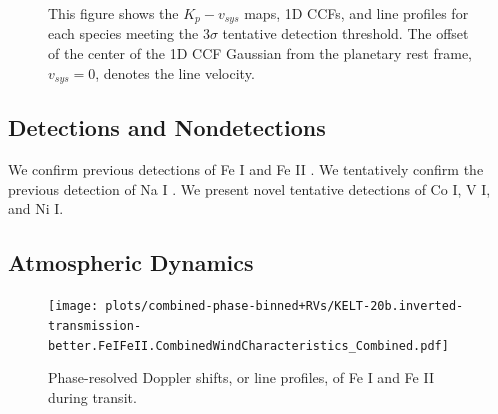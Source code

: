 \documentclass[twocolumn]{aastex631}
\begin{document}
\begin{figure}[ht!]
    \caption{This figure shows the $K_p-v_{sys}$ maps, 1D CCFs, and line profiles for each species meeting the ${3\sigma}$ tentative detection threshold. The offset of the center of the 1D CCF Gaussian from the planetary rest frame, ${v_{sys}}=0$, denotes the line velocity. 
}
    \label{fig:main-CCFs}

    \end{figure}



    
    \subsection{Detections and Nondetections}\label{subsec:Detections}
        We confirm previous detections of Fe I \citep{Nugroho2020} and Fe II \citep{CasasayasBarris2020, Nugroho2020, BelloArufe2022}. We tentatively confirm the previous detection of Na I \citep{CasasayasBarris2020, Nugroho2020, Sicilia2022}. We present novel tentative detections of Co I, V I, and Ni I.

    
    \subsection{Atmospheric Dynamics}\label{subsec:Atmospheric Dynamics}
        

        
    \begin{figure}[]
        \texttt{[image: plots/combined-phase-binned+RVs/KELT-20b.inverted-transmission-better.FeIFeII.CombinedWindCharacteristics\_Combined.pdf]}
        \caption{Phase-resolved Doppler shifts, or line profiles, of Fe I and Fe II during transit.}
        \label{fig:FeI-II-Offset}
    \end{figure}
    
\end{document}
